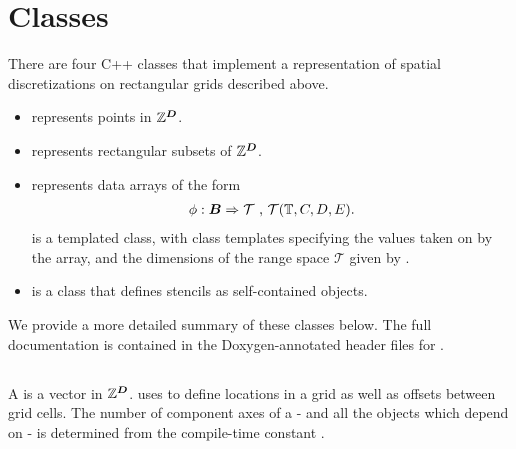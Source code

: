 \documentclass[12pt]{article}
\begin{document}
\section{\libname Classes}

There are four C++ classes that implement a representation of spatial discretizations on rectangular grids described above.
\begin{itemize}
\item
{} represents points in $\mathbb{Z}^{\boldsymbol{D}}$.
\item
{} represents rectangular subsets of $\mathbb{Z}^{\boldsymbol{D}}$.
\item
{} represents data arrays of the form
\begin{gather*}
\phi:{\boldsymbol{B}} \Rightarrow \mathcal{T} \hbox{ , } \mathcal{T}(\mathbb{T},C,D,E).
\end{gather*}
 is a templated class, with class templates specifying the values taken on by the array, and the dimensions of the range space $\mathcal{T}$ given by . 
\item
{} is a class that defines stencils as self-contained objects.
\end{itemize}
We provide a more detailed summary of these classes below. The full documentation is contained in the Doxygen-annotated header files for \libname.

\subsection{}

A  is a vector in $\mathbb{Z}^{\boldsymbol{D}}$. \libname uses  to define locations in a grid as well as offsets between grid cells. The number of component axes of a  - and all the objects which depend on  - is determined from the compile-time constant . 
\end{document}
